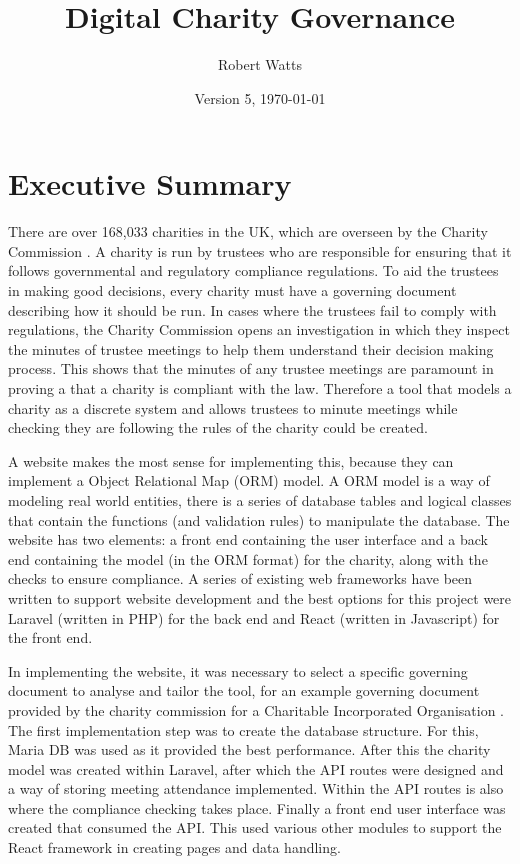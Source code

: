 \documentclass{UoYCSproject}
\author{Robert Watts}
\title{Digital Charity Governance}
\date{Version 5, \today}
\begin{document}
\maketitle
\listoffigures
\listoftables


\chapter*{Executive Summary}


There are over 168,033 charities in the UK, which are overseen by the Charity Commission \cite{commission_report_2022}. A charity is run by trustees who are responsible for ensuring that it follows governmental and regulatory compliance regulations. To aid the trustees in making good decisions, every charity must have a governing document describing how it should be run. In cases where the trustees fail to comply with regulations, the Charity Commission opens an investigation in which they inspect the minutes of trustee meetings to help them understand their decision making process. This shows that the minutes of any trustee meetings are paramount in proving a that a charity is compliant with the law. Therefore a tool that models a charity as a discrete system and allows trustees to minute meetings while checking they are following the rules of the charity could be created. 

A website makes the most sense for implementing this, because they can implement a Object Relational Map (ORM) model. A ORM model is a way of modeling real world entities, there is a series of database tables and logical classes that contain the functions (and validation rules) to manipulate the database. The website has two elements: a front end containing the user interface and a back end containing the model (in the ORM format) for the charity, along with the checks to ensure compliance. A series of existing web frameworks have been written to support website development and the best options for this project were Laravel (written in PHP) for the back end and React (written in Javascript) for the front end.

In implementing the website, it was necessary to select a specific governing document to analyse and tailor the tool, for an example governing document provided by the charity commission for a Charitable Incorporated Organisation \cite{charity_constitution_cio}. The first implementation step was to create the database structure. For this, Maria DB was used as it provided the best performance. After this the charity model was created within Laravel, after which the API routes were designed and a way of storing meeting attendance implemented. Within the API routes is also where the compliance checking takes place. Finally a front end user interface was created that consumed the API. This used various other modules to support the React framework in creating pages and data handling. 
\end{document}
